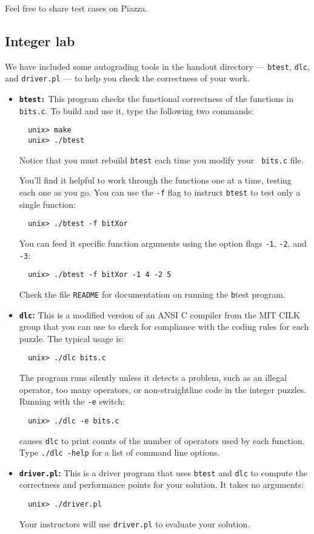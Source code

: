 \documentclass[11pt]{article}
\begin{document}
Feel free to share test cases on Piazza.

\subsection{Integer lab}

We have included some autograding tools in the handout directory ---
\texttt{btest}, \texttt{dlc}, and \texttt{driver.pl} --- to help you
check the correctness of your work.

\begin{itemize}
\item {\bf \texttt{btest:}} This program checks the functional correctness of
  the functions in {\tt bits.c}. To build and use it, type the
  following two commands:
\begin{verbatim}
  unix> make
  unix> ./btest
\end{verbatim}
Notice that you must rebuild \texttt{btest} each time you modify your {\tt
  bits.c} file. 

You'll find it helpful to work through the functions one at a time,
testing each one as you go.  You can use the {\tt -f} flag to instruct
\texttt{btest} to test only a single function:
\begin{verbatim}
  unix> ./btest -f bitXor
\end{verbatim}
You can feed it specific function arguments
using the option flags {\tt -1}, {\tt -2}, and {\tt -3}:
\begin{verbatim}
  unix> ./btest -f bitXor -1 4 -2 5
\end{verbatim}
Check the file {\tt README} for documentation on running the {\texttt
  btest} program.


\item {\bf \texttt{dlc}:} This is a modified version of an ANSI C compiler from
the MIT CILK group that you can use to check for compliance with the
coding rules for each puzzle. The typical usage is:
\begin{verbatim}
  unix> ./dlc bits.c
\end{verbatim}
The program runs silently unless it detects a problem, such as an
illegal operator, too many operators, or non-straightline code in the
integer puzzles.  Running with the \texttt{-e} switch:
\begin{verbatim}
  unix> ./dlc -e bits.c  
\end{verbatim}
causes \texttt{dlc} to print counts of the number of operators used by
each function. Type {\tt ./dlc -help} for a list of command line options. 

\item {\bf \texttt{driver.pl}:} This is a driver program that uses \texttt{btest}
and \texttt{dlc} to compute the correctness and performance points for
your solution. It takes no arguments:
\begin{verbatim}
  unix> ./driver.pl
\end{verbatim}
Your instructors will use \texttt{driver.pl} to evaluate your
solution.

\end{itemize}
\end{document}

